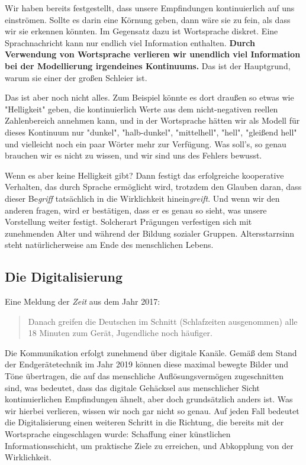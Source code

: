 \documentclass[12pt]{book}
\begin{document}
Wir haben bereits festgestellt, dass unsere Empfindungen kontinuierlich auf uns einströmen. Sollte es darin eine Körnung geben, dann wäre sie zu fein, als dass wir sie erkennen könnten. Im Gegensatz dazu ist Wortsprache diskret. Eine Sprachnachricht kann nur endlich viel Information enthalten. \textbf{Durch Verwendung von Wortsprache verlieren wir unendlich viel Information bei der Modellierung irgendeines Kontinuums.} Das ist der Hauptgrund, warum sie einer der großen Schleier ist.

Das ist aber noch nicht alles. Zum Beispiel könnte es dort draußen so etwas wie "Helligkeit" geben, die kontinuierlich Werte aus dem nicht-negativen reellen Zahlenbereich annehmen kann, und in der Wortsprache hätten wir als Modell für dieses Kontinuum nur "dunkel", "halb-dunkel", "mittelhell", "hell", "gleißend hell" und vielleicht noch ein paar Wörter mehr zur Verfügung. Was soll's, so genau brauchen wir es nicht zu wissen, und wir sind uns des Fehlers bewusst. 

Wenn es aber keine Helligkeit gibt? Dann festigt das erfolgreiche kooperative Verhalten, das durch Sprache ermöglicht wird, trotzdem den Glauben daran, dass dieser Be\emph{griff} tatsächlich in die Wirklichkeit hinein\emph{greift}. Und wenn wir den anderen fragen, wird er bestätigen, dass er es genau so sieht, was unsere Vorstellung weiter festigt. Solcherart Prägungen verfestigen sich mit zunehmenden Alter und während der Bildung sozialer Gruppen. Altersstarrsinn steht natürlicherweise am Ende des menschlichen Lebens.

\subsection{Die Digitalisierung}

Eine Meldung der \emph{Zeit} aus dem Jahr 2017: 
\begin{quote}\begin{tcolorbox}
Danach greifen die Deutschen im Schnitt (Schlafzeiten ausgenommen) alle 18 Minuten zum Gerät, Jugendliche noch häufiger.
\end{tcolorbox}\end{quote}

Die Kommunikation erfolgt zunehmend über digitale Kanäle. Gemäß dem Stand der Endgerätetechnik im Jahr 2019 können diese maximal bewegte Bilder und Töne übertragen, die auf das menschliche Auflösungsvermögen zugeschnitten sind, was bedeutet, dass das digitale Gehäcksel aus menschlicher Sicht kontinuierlichen Empfindungen ähnelt, aber doch grundsätzlich anders ist. Was wir hierbei verlieren, wissen wir noch gar nicht so genau. Auf jeden Fall bedeutet die Digitalisierung einen weiteren Schritt in die Richtung, die bereits mit der Wortsprache eingeschlagen wurde: Schaffung einer künstlichen Informationsschicht, um praktische Ziele zu erreichen, und Abkopplung von der Wirklichkeit.
\end{document}
